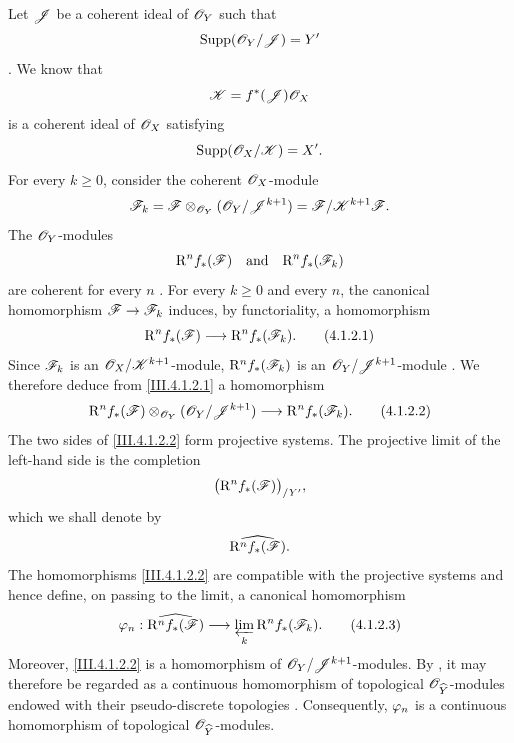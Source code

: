 \begin{env}[4.1.2]
\label{III.4.1.2}
Let $\mathscr{J}$ be a coherent ideal of $\mathscr{O}_Y$ such that
\[
  \operatorname{Supp}(\mathscr{O}_Y/\mathscr{J})=Y'
\]
.
We know  that
\[
  \mathscr{K}=f^*(\mathscr{J})\mathscr{O}_X
\]
is a coherent ideal of $\mathscr{O}_X$ satisfying
\[
  \operatorname{Supp}(\mathscr{O}_X/\mathscr{K})=X'.
\]
For every $k\geq0$, consider the coherent $\mathscr{O}_X$-module
\[
  \mathscr{F}_k
  =
  \mathscr{F}\otimes_{\mathscr{O}_Y}(\mathscr{O}_Y/\mathscr{J}^{k+1})
  =
  \mathscr{F}/\mathscr{K}^{k+1}\mathscr{F}.
\]
The $\mathscr{O}_Y$-modules
\[
  \mathrm{R}^n f_*(\mathscr{F})
  \quad\text{and}\quad
  \mathrm{R}^n f_*(\mathscr{F}_k)
\]
are coherent for every $n$ .
For every $k\geq0$ and every $n$, the canonical homomorphism
$\mathscr{F}\to\mathscr{F}_k$ induces, by functoriality, a homomorphism
\[
  \mathrm{R}^n f_*(\mathscr{F})
  \longrightarrow
  \mathrm{R}^n f_*(\mathscr{F}_k).
  \tag{4.1.2.1}
  \label{III.4.1.2.1}
\]
Since $\mathscr{F}_k$ is an $\mathscr{O}_X/\mathscr{K}^{k+1}$-module,
$\mathrm{R}^n f_*(\mathscr{F}_k)$ is an
$\mathscr{O}_Y/\mathscr{J}^{k+1}$-module .
We therefore deduce from \eqref{III.4.1.2.1} a homomorphism
\[
  \mathrm{R}^n f_*(\mathscr{F})
  \otimes_{\mathscr{O}_Y}(\mathscr{O}_Y/\mathscr{J}^{k+1})
  \longrightarrow
  \mathrm{R}^n f_*(\mathscr{F}_k).
  \tag{4.1.2.2}
  \label{III.4.1.2.2}
\]
The two sides of \eqref{III.4.1.2.2} form projective systems.
The projective limit of the left-hand side is the completion
\[
  \bigl(\mathrm{R}^n f_*(\mathscr{F})\bigr)_{/Y'},
\]
which we shall denote by
\[
  \widehat{\mathrm{R}^n f_*(\mathscr{F})}.
\]
The homomorphisms \eqref{III.4.1.2.2} are compatible with the projective
systems and hence define, on passing to the limit, a canonical
homomorphism
\[
  \varphi_n:
  \widehat{\mathrm{R}^n f_*(\mathscr{F})}
  \longrightarrow
  \varprojlim_k\mathrm{R}^n f_*(\mathscr{F}_k).
  \tag{4.1.2.3}
  \label{III.4.1.2.3}
\]
Moreover, \eqref{III.4.1.2.2} is a homomorphism of
$\mathscr{O}_Y/\mathscr{J}^{k+1}$-modules.
By , it may therefore be regarded as a continuous
homomorphism of topological $\mathscr{O}_{\widehat{Y}}$-modules endowed with
their pseudo-discrete topologies .
Consequently, $\varphi_n$ is a continuous homomorphism of topological
$\mathscr{O}_{\widehat{Y}}$-modules.
\end{env}

